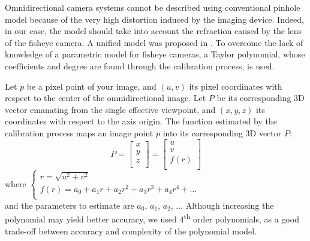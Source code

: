 Omnidirectional camera systems cannot be described using conventional pinhole model because of the very high distortion induced by the imaging device. Indeed, in our case, the model should take into account the refraction caused by the lens of the fisheye camera. A unified model was proposed in \cite{scara}. To overcome the lack of knowledge of a parametric model for fisheye cameras, a Taylor polynomial, whose coefficients and degree are found through the calibration process, is used.

Let $p$ be a pixel point of your image, and $(u,v)$ its pixel coordinates with respect to the center of the omnidirectional image. Let $P$ be its corresponding 3D vector emanating from the single effective viewpoint, and $(x,y,z)$ its coordinates with respect to the axis origin. The function estimated by the calibration process maps an image point $p$ into its corresponding 3D vector $P$:\\
\begin{equation}
\label{equ:cameraModel1}
P = \begin{bmatrix}
		x\\
		y\\
		z\\
	\end{bmatrix}
	= \begin{bmatrix}
		u\\
		v\\
		f(r)\\
	  \end{bmatrix}
\end{equation}
where 
$
\begin{cases}
r = \sqrt{u^2 + v^2}\\
f(r)= a_0 + a_1r + a_2r^2 + a_3r^3 + a_4r^4 + ...\\
\end{cases}
$\\
and the parameters to estimate are $a_0$, $a_1$, $a_2$, ...
Although increasing the polynomial may yield better accuracy, we used 4\textsuperscript{th} order polynomials, as a good trade-off between accuracy and complexity of the polynomial model.

